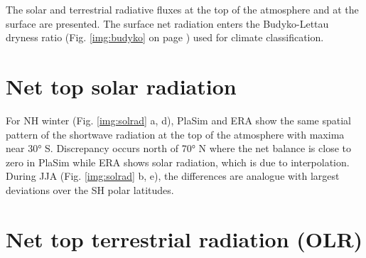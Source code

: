 \documentclass[12pt,a4paper,twoside,openright,headinclude,liststotoc,bibtotoc]{scrreprt}
\begin{document}
The solar and terrestrial radiative fluxes at the top of the atmosphere and at the surface are presented. The surface net radiation enters the Budyko-Lettau dryness ratio (Fig. \ref{img:budyko} on page \pageref{img:budyko}) used for climate classification. 

\vspace{-0.4cm}
\section{Net top solar radiation}
\vspace{-0.4cm}
 
For NH winter (Fig. \ref{img:solrad} a, d), PlaSim and ERA show the same spatial pattern of the shortwave radiation at the top of the atmosphere with maxima near 30° S. Discrepancy occurs north of 70° N where the net balance is close to zero in PlaSim while ERA shows solar radiation, which is due to interpolation. During JJA (Fig. \ref{img:solrad} b, e), the differences are analogue with largest deviations over the SH polar latitudes.


\vspace{-0.4cm}
\section{Net top terrestrial radiation (OLR)}
\vspace{-0.4cm}
\end{document}
